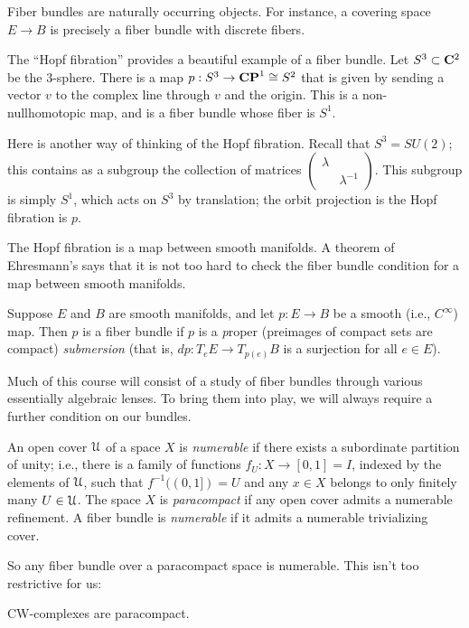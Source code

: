 Fiber bundles are naturally occurring objects.
For instance, a covering space $E\to B$ is precisely 
a fiber bundle with discrete fibers. 
\begin{example}
    The ``Hopf fibration'' provides a beautiful example of a fiber bundle.
    Let $S^3\subset \mathbf C^2$ be the $3$-sphere.
    There is a map $p:S^3\to \mathbf{CP}^1 \cong S^2$ that is given by sending a vector $v$ to the
    complex line through $v$ and the origin.
    This is a non-nullhomotopic map, and is a fiber bundle whose fiber is $S^1$.
    
    Here is another way of thinking of the Hopf fibration.
    Recall that $S^3 = SU(2)$; this contains as a subgroup
    the collection of matrices $\begin{pmatrix}\lambda & \\ & \lambda^{-1}\end{pmatrix}$.
	This subgroup is simply $S^1$, which acts on $S^3$ by translation; 
	the orbit projection is the Hopf fibration is $p$.
\end{example}
The Hopf fibration is a map between smooth manifolds.
A theorem of Ehresmann's says that it is not too hard to check the fiber bundle
condition for a map between smooth manifolds. 
\begin{theorem}[Ehresmann]
    Suppose $E$ and $B$ are smooth manifolds, and let $p:E\to B$ be a smooth (i.e., $C^\infty$) map.
    Then $p$ is a fiber bundle if $p$ is a {\emph proper} (preimages of compact
sets are compact)
\emph{submersion} (that is, $dp:T_e E\to T_{p(e)} B$ is a surjection for all $e\in E$).
\end{theorem}
Much of this course will consist of a study of fiber bundles through 
various essentially algebraic lenses. To bring them into play, we will 
always require a further condition on our bundles. 
\begin{definition}\label{numerable}
An open cover $\mathcal U$ of a space  $X$  is \emph{numerable}
    if there exists a subordinate partition of unity; i.e.,
    there is a family of functions $f_U:X\to [0,1]=I$, indexed by the
elements of $\mathcal U$, such that $f^{-1}((0,1]) = U$
    and any $x\in X$ belongs to only finitely many $U\in\mathcal U$.
    The space $X$ is \emph{paracompact} if any open cover admits a numerable refinement.
    A fiber bundle is \emph{numerable} if it admits a numerable trivializing cover.
\end{definition}
So any fiber bundle over a paracompact space is numerable. 
This isn't too restrictive for us:
\begin{prop}
CW-complexes are paracompact.
\end{prop}

